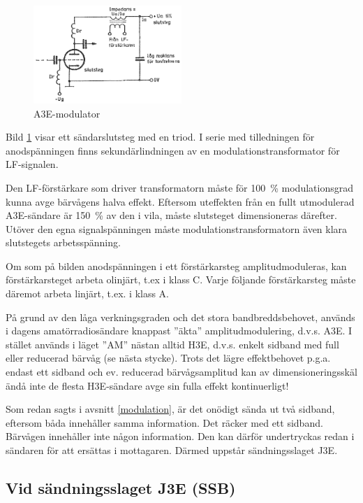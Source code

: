 \begin{figure}
\includegraphics[width=0.5\textwidth]{images/cropped_pdfs/bild_2_3-89.pdf}
\caption{A3E-modulator}
\label{fig:BildII3-89}
\end{figure}

Bild \ref{fig:BildII3-89} visar ett sändarslutsteg med en triod.
I serie med tilledningen för anodspänningen finns sekundärlindningen av en
modulationstransformator för LF-signalen.

Den LF-förstärkare som driver transformatorn måste för 100~\% modulationsgrad
kunna avge bärvågens halva effekt.
Eftersom uteffekten från en fullt utmodulerad A3E-sändare är 150~\% av den i
vila, måste slutsteget dimensioneras därefter.
Utöver den egna signalspänningen måste modulationstransformatorn även klara
slutstegets arbetsspänning.

Om som på bilden anodspänningen i ett förstärkarsteg amplitudmoduleras,
kan förstärkarsteget arbeta olinjärt, t.ex i klass C.
Varje följande förstärkarsteg måste däremot arbeta linjärt, t.ex. i klass A.

På grund av den låga verkningsgraden och det stora bandbreddsbehovet,
används i dagens amatörradiosändare knappast ''äkta'' amplitudmodulering,
d.v.s. A3E.
I stället används i läget ''AM'' nästan alltid H3E, d.v.s. enkelt sidband med
full eller reducerad bärvåg (se nästa stycke).
Trots det lägre effektbehovet p.g.a. endast ett sidband och ev. reducerad
bärvågsamplitud kan av dimensioneringsskäl ändå inte de flesta H3E-sändare avge
sin fulla effekt kontinuerligt!

Som redan sagts i avsnitt \ref{modulation}, är det onödigt sända ut två sidband,
eftersom båda innehåller samma information.
Det räcker med ett sidband.
Bärvågen innehåller inte någon information.
Den kan därför undertryckas redan i sändaren för att ersättas i mottagaren.
Därmed uppstår sändningsslaget J3E.

\subsection{Vid sändningsslaget J3E (SSB)}

